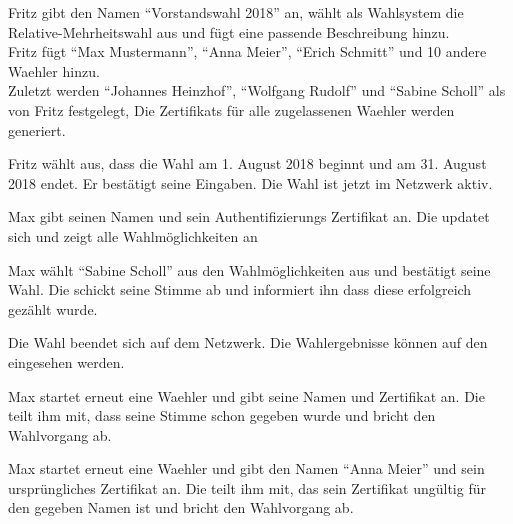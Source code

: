 \documentclass[parskip=full,11pt,twoside]{scrartcl}
\begin{document}
		{Fritz gibt den Namen \enquote{Vorstandswahl 2018} an, wählt als Wahlsystem die \gls{Relative-Mehrheitswahl} aus und fügt eine passende Beschreibung hinzu.\\
		Fritz fügt \enquote{Max Mustermann}, \enquote{Anna Meier}, \enquote{Erich Schmitt} und 10 andere \gls{Waehler} hinzu.\\
		Zuletzt werden \enquote{Johannes Heinzhof}, \enquote{Wolfgang Rudolf} und \enquote{Sabine Scholl} als  von Fritz festgelegt,}
		{Die \glspl{Zertifikat} für alle zugelassenen \gls{Waehler} werden generiert.}	
	
\teststep{}
		{Fritz wählt aus, dass die \gls{Wahl} am 1. August 2018 beginnt und am 31. August 2018 endet. Er bestätigt seine Eingaben.}
		{Die \gls{Wahl} ist jetzt im \gls{Netzwerk} aktiv.}

		{Max gibt seinen Namen und sein Authentifizierungs \gls{Zertifikat} an.}
		{Die  updatet sich und zeigt alle Wahlmöglichkeiten an}
		
\teststep{}
		{Max wählt \enquote{Sabine Scholl} aus den Wahlmöglichkeiten aus und bestätigt seine Wahl.}
		{Die  schickt seine \gls{Stimme} ab und informiert ihn dass diese erfolgreich gezählt wurde.}
		
		{Die \gls{Wahl} beendet sich auf dem \gls{Netzwerk}.}
		{Die Wahlergebnisse können auf den  eingesehen werden.}

\pagebreak


		{Max startet erneut eine \gls{Waehler}  und gibt seine Namen und \gls{Zertifikat} an.}
		{Die  teilt ihm mit, dass seine \gls{Stimme} schon gegeben wurde und bricht den Wahlvorgang ab.}

\teststep{}
		{Max startet erneut eine \gls{Waehler}  und gibt den Namen \enquote{Anna Meier} und sein ursprüngliches \gls{Zertifikat} an.}
		{Die  teilt ihm mit, das sein \gls{Zertifikat} ungültig für den gegeben Namen ist und bricht den Wahlvorgang ab.}
\end{document}
